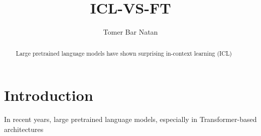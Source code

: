 \documentclass[runningheads]{llncs}
\begin{document}
%
\title{ICL-VS-FT} 

\author{Tomer Bar Natan}


\maketitle      

\begin{abstract}
  Large pretrained language models have shown
  surprising in-context learning (ICL)
\end{abstract}
\section{Introduction}

In recent years, large pretrained language models,
especially in Transformer-based architectures \cite{lipton2018}
 
 
\end{document}
